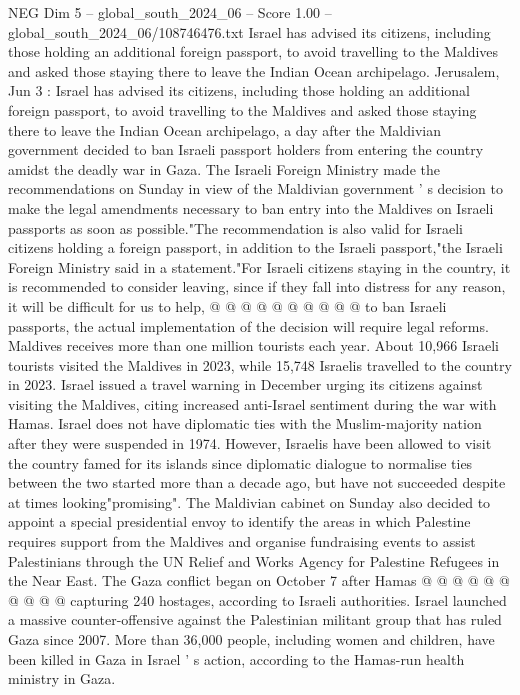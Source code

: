 \begin{textsample}{NEG Dim 5 – global\_south\_2024\_06 – Score 1.00 – global\_south\_2024\_06/108746476.txt}  \label{ex:f5_neg_228}
Israel has advised its citizens, including those holding an additional foreign passport, to avoid travelling to the Maldives and asked those staying there to leave the Indian Ocean archipelago.
Jerusalem, Jun 3 : Israel has advised its citizens, including those holding an additional foreign passport, to avoid travelling to the Maldives and asked those staying there to leave the Indian Ocean archipelago, a day after the Maldivian government decided to ban Israeli passport holders from entering the country amidst the deadly war in Gaza.
The Israeli Foreign Ministry made the recommendations on Sunday in view of the Maldivian government ' s decision to make the legal amendments necessary to ban entry into the Maldives on Israeli passports as soon as possible."The recommendation is also valid for Israeli citizens holding a foreign passport, in addition to the Israeli passport,"the Israeli Foreign Ministry said in a statement."For Israeli citizens staying in the country, it is recommended to consider leaving, since if they fall into distress for any reason, it will be difficult for us to help, @ @ @ @ @ @ @ @ @ @ to ban Israeli passports, the actual implementation of the decision will require legal reforms.
Maldives receives more than one million tourists each year.
About 10,966 Israeli tourists visited the Maldives in 2023, while 15,748 Israelis travelled to the country in 2023.
Israel issued a travel warning in December urging its citizens against visiting the Maldives, citing increased anti-Israel sentiment during the war with Hamas.
Israel does not have diplomatic ties with the Muslim-majority nation after they were suspended in 1974.
However, Israelis have been allowed to visit the country famed for its islands since diplomatic dialogue to normalise ties between the two started more than a decade ago, but have not succeeded despite at times looking"promising".
The Maldivian cabinet on Sunday also decided to appoint a special presidential envoy to identify the areas in which Palestine requires support from the Maldives and organise fundraising events to assist Palestinians through the UN Relief and Works Agency for Palestine Refugees in the Near East.
The Gaza conflict began on October 7 after Hamas @ @ @ @ @ @ @ @ @ @ capturing 240 hostages, according to Israeli authorities.
Israel launched a massive counter-offensive against the Palestinian militant group that has ruled Gaza since 2007.
More than 36,000 people, including women and children, have been killed in Gaza in Israel ' s action, according to the Hamas-run health ministry in Gaza.

\end{textsample}
